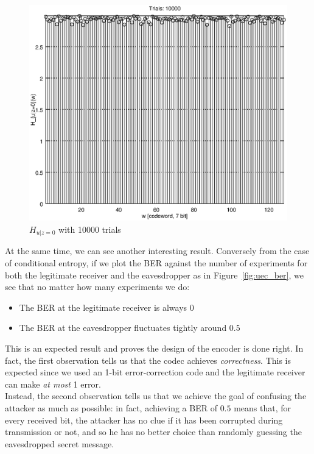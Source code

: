 \documentclass[a4paper,12pt,titlepage]{article}
\begin{document}
\begin{figure}[h]
  \centering
  \includegraphics[scale=0.8]{uec_10000.eps}
  \caption{$H_{u|z=0}$ with 10000 trials}
  \label{fig:uec_10000}
\end{figure}

At the same time, we can see another interesting result. Conversely from the
case of conditional entropy, if we plot the BER against the number of
experiments for both the legitimate receiver and the eavesdropper as in
Figure~\ref{fig:uec_ber}, we see that
no matter how many experiments we do:
\begin{itemize}
  \item The BER at the legitimate receiver is always $0$
  \item The BER at the eavesdropper fluctuates tightly around $0.5$
\end{itemize}
This is an expected result and proves the design of the encoder is done right.
In fact, the first observation tells us that the codec achieves \emph{correctness}. This is
expected since we used an 1-bit error-correction code and the legitimate
receiver can make \emph{at most} 1 error. \\
Instead, the second observation tells us that we achieve the goal of confusing
the attacker as much as possible: in fact, achieving a BER of $0.5$ means that,
for every received bit, the attacker has no clue if it has been corrupted during
transmission or not, and so he has no better choice than randomly guessing the
eavesdropped secret message.
\end{document}
